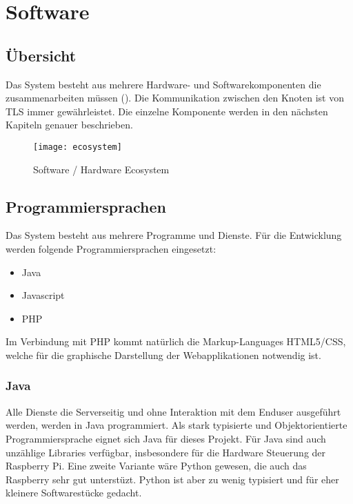 \section{Software}
\label{sec:chapterexample}

\subsection{Übersicht}
Das System besteht aus mehrere Hardware- und Softwarekomponenten die zusammenarbeiten müssen (). Die Kommunikation zwischen den Knoten ist von TLS immer gewährleistet. Die einzelne Komponente werden in den nächsten Kapiteln genauer beschrieben.

\begin{figure}[htb!]
	\begin{center}
		\texttt{[image: ecosystem]}
		\caption[Software / Hardware Ecosystem]{Software / Hardware Ecosystem}
		\label{fig:echosystem}
	\end{center}
\end{figure}

\subsection{Programmiersprachen}
Das System besteht aus mehrere Programme und Dienste. Für die Entwicklung werden folgende Programmiersprachen eingesetzt:
\begin{itemize}
	\item Java
	\item Javascript
	\item PHP
\end{itemize}
Im Verbindung mit PHP kommt natürlich die Markup-Languages HTML5/CSS, welche für die graphische Darstellung der Webapplikationen notwendig ist.

\subsubsection{Java}
Alle Dienste die Serverseitig und ohne Interaktion mit dem Enduser ausgeführt werden, werden in Java programmiert. Als stark typisierte und Objektorientierte Programmiersprache eignet sich Java für dieses Projekt. Für Java sind auch unzählige Libraries verfügbar, insbesondere für die Hardware Steuerung der Raspberry Pi. Eine zweite Variante wäre Python gewesen, die auch das Raspberry sehr gut unterstüzt. Python ist aber zu wenig typisiert und für eher kleinere Softwarestücke gedacht.


